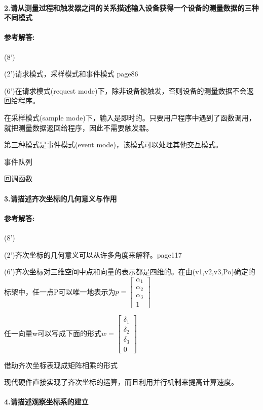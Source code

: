 \documentclass[12pt,a4paper,UTF8]{ctexart}
\begin{document}
	\paragraph{2.请从测量过程和触发器之间的关系描述输入设备获得一个设备的测量数据的三种不同模式}
	\paragraph{参考解答:}(8')
	\par (2')请求模式，采样模式和事件模式 page86
	\par (6')在请求模式(request mode)下，除非设备被触发，否则设备的测量数据不会返回给程序。
	\par 在采样模式(sample mode)下，输入是即时的。只要用户程序中遇到了函数调用，就把测量数据返回给程序，因此不需要触发器。
	\par 第三种模式是事件模式(event mode)，该模式可以处理其他交互模式。
	\par 事件队列
	\par 回调函数
	\newpage
	\paragraph{3.请描述齐次坐标的几何意义与作用}
	\paragraph{参考解答:}(8')
	\par (2')齐次坐标的几何意义可以从许多角度来解释。page117
	\par (6')齐次坐标对三维空间中点和向量的表示都是四维的。在由(v1,v2,v3,Po)确定的标架中，任一点P可以唯一地表示为$p=\begin{bmatrix}
	\alpha_{1}\\\alpha_{2}\\\alpha_{3}\\1
	\end{bmatrix}$
	\par 任一向量w可以写成下面的形式$w=\begin{bmatrix}
	\delta_{1}\\\delta_{2}\\\delta_{3}\\0
	\end{bmatrix}$
	\par 借助齐次坐标表现成矩阵相乘的形式
	\par 现代硬件直接实现了齐次坐标的运算，而且利用并行机制来提高计算速度。

	\paragraph{4.请描述观察坐标系的建立}
\end{document}
